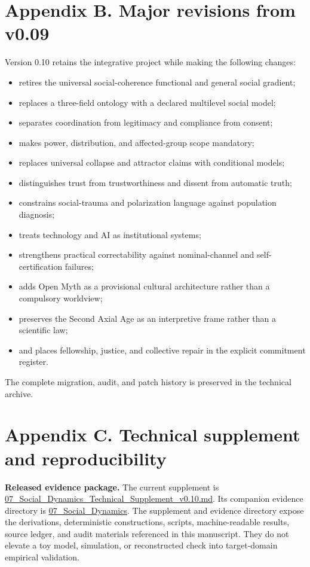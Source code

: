 \documentclass[
  11pt,
]{article}
\providecommand{\tightlist}{%
  \setlength{\itemsep}{0pt}\setlength{\parskip}{0pt}}
\begin{document}
\section{Appendix B. Major revisions from
v0.09}\label{appendix-b.-major-revisions-from-v0.09}

Version 0.10 retains the integrative project while making the following
changes:

\begin{itemize}
\tightlist
\item
  retires the universal social-coherence functional and general social
  gradient;
\item
  replaces a three-field ontology with a declared multilevel social
  model;
\item
  separates coordination from legitimacy and compliance from consent;
\item
  makes power, distribution, and affected-group scope mandatory;
\item
  replaces universal collapse and attractor claims with conditional
  models;
\item
  distinguishes trust from trustworthiness and dissent from automatic
  truth;
\item
  constrains social-trauma and polarization language against population
  diagnosis;
\item
  treats technology and AI as institutional systems;
\item
  strengthens practical correctability against nominal-channel and
  self-certification failures;
\item
  adds Open Myth as a provisional cultural architecture rather than a
  compulsory worldview;
\item
  preserves the Second Axial Age as an interpretive frame rather than a
  scientific law;
\item
  and places fellowship, justice, and collective repair in the explicit
  commitment register.
\end{itemize}

The complete migration, audit, and patch history is preserved in the
technical archive.

\section{Appendix C. Technical supplement and
reproducibility}\label{appendix-c.-technical-supplement-and-reproducibility}

\textbf{Released evidence package.} The current supplement is
\href{../supplements/07_Social_Dynamics_Technical_Supplement_v0.10.md}{07\_Social\_Dynamics\_Technical\_Supplement\_v0.10.md}.
Its companion evidence directory is
\href{../evidence/07_Social_Dynamics/README.md}{07\_Social\_Dynamics}.
The supplement and evidence directory expose the derivations,
deterministic constructions, scripts, machine-readable results, source
ledger, and audit materials referenced in this manuscript. They do not
elevate a toy model, simulation, or reconstructed check into
target-domain empirical validation.
\end{document}

